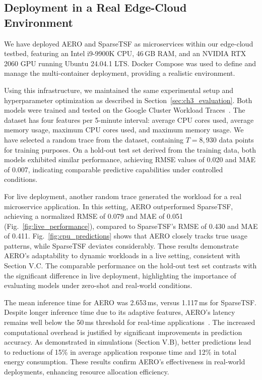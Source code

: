 \subsection{Deployment in a Real Edge-Cloud Environment}
\label{sec:ch3_live_deployment}

We have deployed \ac{AERO} and \ac{SparseTSF} as microservices within our edge-cloud testbed, featuring an Intel i9-9900K \ac{CPU}, 46\,GB \ac{RAM}, and an NVIDIA RTX 2060 \ac{GPU} running Ubuntu 24.04.1 LTS. Docker Compose was used to define and manage the multi-container deployment, providing a realistic environment.

Using this infrastructure, we maintained the same experimental setup and hyperparameter optimization as described in Section~\ref{sec:ch3_evaluation}. Both models were trained and tested on the Google Cluster Workload Traces~\cite{GoogleTrace}. The dataset has four features per 5-minute interval: average \ac{CPU} cores used, average memory usage, maximum \ac{CPU} cores used, and maximum memory usage. We have selected a random trace from the dataset, containing $T = 8,\!930$ data points for training purposes. On a hold-out test set derived from the training data, both models exhibited similar performance, achieving \ac{RMSE} values of 0.020 and \ac{MAE} of 0.007, indicating comparable predictive capabilities under controlled conditions.

For live deployment, another random trace generated the workload for a real microservice application. In this setting, \ac{AERO} outperformed \ac{SparseTSF}, achieving a normalized \ac{RMSE} of 0.079 and \ac{MAE} of 0.051 (Fig.~\ref{fig:live_performance}), compared to \ac{SparseTSF}'s \ac{RMSE} of 0.430 and \ac{MAE} of 0.411. Fig.~\ref{fig:cpu_predictions} shows that \ac{AERO} closely tracks true usage patterns, while \ac{SparseTSF} deviates considerably. These results demonstrate \ac{AERO}'s adaptability to dynamic workloads in a live setting, consistent with Section V.C. The comparable performance on the hold-out test set contrasts with the significant difference in live deployment, highlighting the importance of evaluating models under zero-shot and real-world conditions.

The mean inference time for \ac{AERO} was 2.653\,ms, versus 1.117\,ms for \ac{SparseTSF}. Despite longer inference time due to its adaptive features, \ac{AERO}'s latency remains well below the 50\,ms threshold for real-time applications~\cite{8334540}. The increased computational overhead is justified by significant improvements in prediction accuracy. As demonstrated in simulations (Section V.B), better predictions lead to reductions of 15\% in average application response time and 12\% in total energy consumption. These results confirm \ac{AERO}'s effectiveness in real-world deployments, enhancing resource allocation efficiency.


